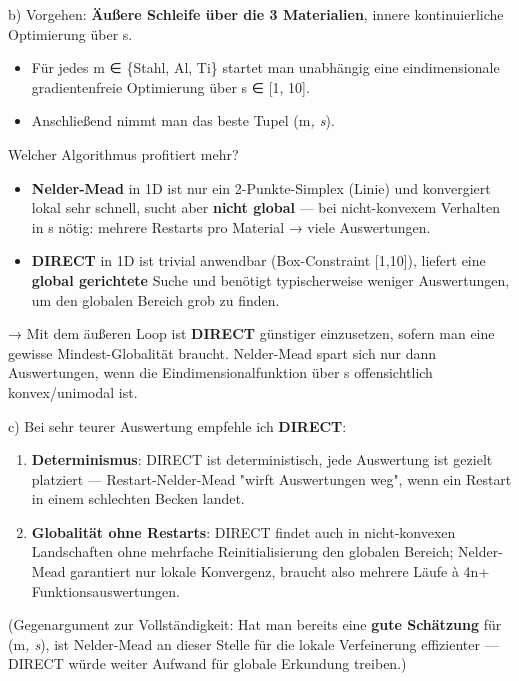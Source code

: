 \documentclass[11pt, a4paper]{article}
\begin{document}
b) Vorgehen: \textbf{Äußere Schleife über die 3 Materialien}, innere kontinuierliche Optimierung über s.

\begin{itemize}
  \item Für jedes m ∈ \{Stahl, Al, Ti\} startet man unabhängig eine eindimensionale gradientenfreie Optimierung über s ∈ [1, 10].
  \item Anschließend nimmt man das beste Tupel (m\textit{, s}).
\end{itemize}

Welcher Algorithmus profitiert mehr?

\begin{itemize}
  \item \textbf{Nelder-Mead} in 1D ist nur ein 2-Punkte-Simplex (Linie) und konvergiert lokal sehr schnell, sucht aber \textbf{nicht global} — bei nicht-konvexem Verhalten in s nötig: mehrere Restarts pro Material → viele Auswertungen.
  \item \textbf{DIRECT} in 1D ist trivial anwendbar (Box-Constraint [1,10]), liefert eine \textbf{global gerichtete} Suche und benötigt typischerweise weniger Auswertungen, um den globalen Bereich grob zu finden.
\end{itemize}

→ Mit dem äußeren Loop ist \textbf{DIRECT} günstiger einzusetzen, sofern man eine gewisse Mindest-Globalität braucht. Nelder-Mead spart sich nur dann Auswertungen, wenn die Eindimensionalfunktion über s offensichtlich konvex/unimodal ist.


c) Bei sehr teurer Auswertung empfehle ich \textbf{DIRECT}:

\begin{enumerate}
  \item \textbf{Determinismus}: DIRECT ist deterministisch, jede Auswertung ist gezielt platziert — Restart-Nelder-Mead "wirft Auswertungen weg", wenn ein Restart in einem schlechten Becken landet.
  \item \textbf{Globalität ohne Restarts}: DIRECT findet auch in nicht-konvexen Landschaften ohne mehrfache Reinitialisierung den globalen Bereich; Nelder-Mead garantiert nur lokale Konvergenz, braucht also mehrere Läufe à 4n+ Funktionsauswertungen.
\end{enumerate}

(Gegenargument zur Vollständigkeit: Hat man bereits eine \textbf{gute Schätzung} für (m\textit{, s}), ist Nelder-Mead an dieser Stelle für die lokale Verfeinerung effizienter — DIRECT würde weiter Aufwand für globale Erkundung treiben.)
\end{document}
